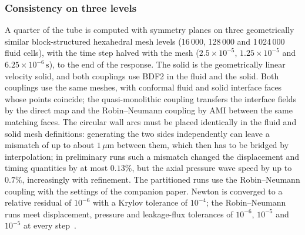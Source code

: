 \subsubsection{Consistency on three levels}\label{sec:tube3d_consistency}

A quarter of the tube is computed with symmetry planes on three geometrically similar block-structured hexahedral mesh levels (16\,000, 128\,000 and 1\,024\,000 fluid cells), with the time step halved with the mesh ($2.5\times10^{-5}$, $1.25\times10^{-5}$ and $6.25\times10^{-6}\,\mathrm{s}$), to the end of the response.
The solid is the geometrically linear velocity solid, and both couplings use BDF2 in the fluid and the solid.
Both couplings use the same meshes, with conformal fluid and solid interface faces whose points coincide; the quasi-monolithic coupling transfers the interface fields by the direct map and the Robin--Neumann coupling by AMI between the same matching faces.
The circular wall arcs must be placed identically in the fluid and solid mesh definitions: generating the two sides independently can leave a mismatch of up to about $1\,\mu\mathrm{m}$ between them, which then has to be bridged by interpolation; in preliminary runs such a mismatch changed the displacement and timing quantities by at most $0.13\%$, but the axial pressure wave speed by up to $0.7\%$, increasingly with refinement.
The partitioned runs use the Robin--Neumann coupling with the settings of the companion paper.
Newton is converged to a relative residual of $10^{-6}$ with a Krylov tolerance of $10^{-4}$; the Robin--Neumann runs meet displacement, pressure and leakage-flux tolerances of $10^{-6}$, $10^{-5}$ and $10^{-5}$ at every step~\citep{CardiffFSIVerification2026}.

